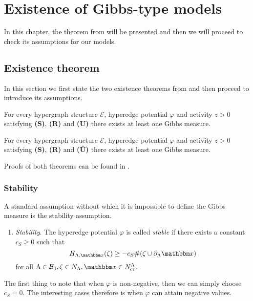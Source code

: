 \chapter{Existence of Gibbs-type models}
In this chapter, the theorem from \cite{DL07} will be presented and then we will proceed to check its assumptions for our models.

\section{Existence theorem}
In this section we first state the two existence theorems from \cite{DL07} and then proceed to introduce its assumptions.

\begin{theorem}
	For every hypergraph structure $\mathcal E$, hyperedge potential $\varphi$ and activity $z>0$ satisfying \textbf{(S)}, \textbf{(R)} and \textbf{(U)} there exists at least one Gibbs measure.
\end{theorem}

\begin{theorem}
	For every hypergraph structure $\mathcal E$, hyperedge potential $\varphi$ and activity $z>0$ satisfying \textbf{(S)}, \textbf{(R)} and \textbf{(\^{U})} there exists at least one Gibbs measure.
\end{theorem}

Proofs of both theorems can be found in \cite{DL07}.

\subsection{Stability}
A standard assumption without which it is impossible to define the Gibbs measure is the stability assumption.

\begin{enumerate}[\textbf{(S)}] 
	\item \textit{Stability}. The hyperedge potential $\varphi$ is called \textit{stable} if there exists a constant $c_S \geq 0$ such that 
$$H_{\Lambda,\x}(\zeta) \geq -c_S \#(\zeta \cup \partial_\Lambda \x)$$
for all $\Lambda \in \mathcal B_0, \zeta \in N_\Lambda, \x \in N^\Lambda_{\text{cr}}$.
\end{enumerate}


The first thing to note that when $\varphi$ is non-negative, then we can simply choose $c_S = 0$. The interesting cases therefore is when $\varphi$ can attain negative values.\newline

